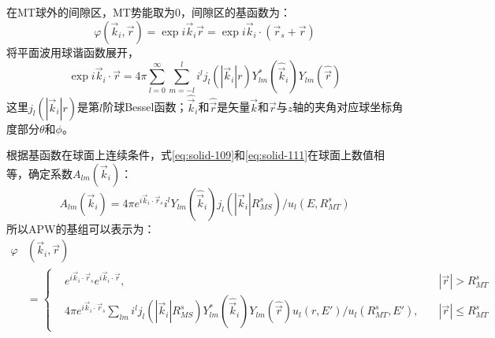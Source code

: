 在MT球外的间隙区，MT势能取为0，间隙区的基函数为：
\begin{equation}
  \varphi(\vec k_i,\vec r)=\exp i\vec k_i\vec r=\exp i\vec k_i\cdot(\vec r_s+\vec r)
  \label{eq:solid-111}
\end{equation}
将平面波用球谐函数展开，
\begin{equation}
  \exp i\vec k_i\cdot\vec r=4\pi\sum_{l=0}^{\infty}\sum_{m=-l}^li^lj_l(|\vec k_i|r)Y_{lm}^{\ast}(\hat{\vec k}_i)Y_{lm}(\hat{\vec r})
  \label{eq:solid-112}
\end{equation}
这里$j_l(|\vec k_i|r)$是第$l$阶球Bessel函数；$\hat{\vec k}_i$和$\hat{\vec r}$是矢量$\vec k$和$\vec r$与$z$轴的夹角对应球坐标角度部分$\theta$和$\phi$。

根据基函数在球面上连续条件，式\eqref{eq:solid-109}和\eqref{eq:solid-111}在球面上数值相等，确定系数$A_{lm}(\vec k_i)$：
$$A_{lm}(\vec k_i)=4\pi e^{i\vec k_i\cdot\vec r_s}i^lY_{lm}(\hat{\vec k}_i)j_l(|\vec k_i|R_{MS}^s)/u_l(E,R_{MT}^s)$$
所以APW的基组可以表示为：
\begin{equation}
  \begin{split}
    \varphi&(\vec k_i,\vec r)\\
    &=\left\{\begin{aligned}
    &e^{i\vec k_i\cdot\vec r_s}e^{i\vec k_i\cdot\vec r},&|\vec r|>R_{MT}^s\\
    &4\pi e^{i\vec k_i\cdot\vec r_s}\sum_{lm}i^lj_l(|\vec k_i|R_{MS}^s)Y_{lm}^{\ast}(\hat{\vec k}_i)Y_{lm}(\hat{\vec r})u_l(r,E')/u_l(R_{MT}^s,E'),\quad&|\vec r|\leqslant R_{MT}^s
    \end{aligned} \right.
  \end{split}
  \label{eq:solid-113}
\end{equation}

